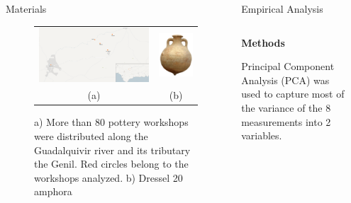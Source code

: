 \documentclass[final]{beamer}
\newlength{\sepwid}
\newlength{\onecolwid}
\newlength{\twocolwid}
\begin{document}
\begin{frame}[t]
\begin{columns}[t]
\begin{column}{\onecolwid}
\begin{block}{Materials}
\begin{figure}
\begin{tabular}{cc}
\includegraphics[width=0.7\linewidth]{images/fig1.png} &
\includegraphics[width=0.2\linewidth]{images/amphorae.png} \\
(a) & (b)
\end{tabular}

\singlespace
\caption{a) More than 80 pottery workshops were distributed along the Guadalquivir river and its tributary the Genil. Red circles belong to the workshops analyzed. b) Dressel 20 amphora}
\label{fig:betica}
\end{figure}


 \end{block}
\end{column} %

\begin{column}{\twocolwid}


\begin{block}{Empirical Analysis}

\begin{columns}[t,totalwidth=\twocolwid]
\begin{column}{\onecolwid} %


{\textbf{Methods}} 
\justify

Principal Component Analysis (PCA) was used to capture most of the variance of the 8 measurements into 2 variables. 


\end{column}

\begin{column}{\sepwid}\end{column} %


\end{columns}
\end{block}
\end{column}
\end{columns}
\end{frame}
\end{document}
